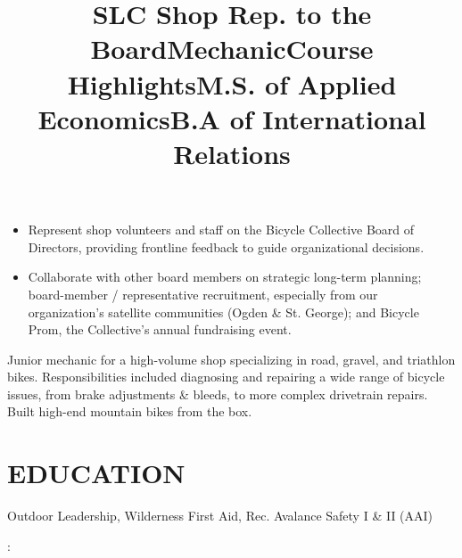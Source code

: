 \documentclass[resmargin, centered, 11pt]{../res}
\begin{document}
\begin{resume}
\title{SLC Shop Rep. to the Board}
\begin{position}
	\begin{itemize}
		\item {} Represent shop volunteers and staff on the Bicycle Collective Board of Directors, providing frontline feedback to guide organizational decisions.
		\item {} Collaborate with other board members on strategic long-term planning; board-member / representative recruitment, especially from our organization's satellite communities (Ogden \& St. George); and Bicycle Prom, the Collective's annual fundraising event.
	\end{itemize}
\end{position}

\title{Mechanic}
\begin{position}
	Junior mechanic for a high-volume shop specializing in road, gravel, and triathlon bikes. Responsibilities included diagnosing and repairing a wide range of bicycle issues, from brake adjustments \& bleeds, to more complex drivetrain repairs. Built high-end mountain bikes from the box.
\end{position}

\fullline

\section{EDUCATION}

\title{Course Highlights}
\employer{}
\dates{}
\location{}
\begin{position}
Outdoor Leadership, Wilderness First Aid, Rec. Avalance Safety I \& II (AAI)
\end{position}

\title{M.S. of Applied Economics}
\begin{position}
	: 
\end{position}

\title{B.A of International Relations}
\begin{position}
\end{position}

\end{resume}
\end{document}
